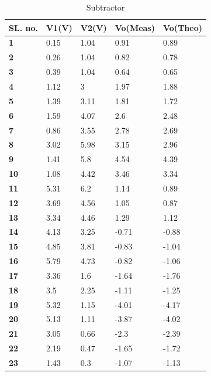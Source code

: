 \documentclass{scrartcl}
\newcommand{\1}{\mathbbm{1}}
\begin{document}
\begin{table}[!ht]
    \centering
    \caption{Subtractor}
    \begin{tabular}{|l|l|l|l|l|}
    \hline
        \textbf{SL. no.} & \textbf{V1(V)} & \textbf{V2(V)} & \textbf{Vo(Meas)} & \textbf{Vo(Theo)} \\ \hline
        \textbf{1} & 0.15 & 1.04 & 0.91 & 0.89 \\ \hline
        \textbf{2} & 0.26 & 1.04 & 0.82 & 0.78 \\ \hline
        \textbf{3} & 0.39 & 1.04 & 0.64 & 0.65 \\ \hline
        \textbf{4} & 1.12 & 3 & 1.97 & 1.88 \\ \hline
        \textbf{5} & 1.39 & 3.11 & 1.81 & 1.72 \\ \hline
        \textbf{6} & 1.59 & 4.07 & 2.6 & 2.48 \\ \hline
        \textbf{7} & 0.86 & 3.55 & 2.78 & 2.69 \\ \hline
        \textbf{8} & 3.02 & 5.98 & 3.15 & 2.96 \\ \hline
        \textbf{9} & 1.41 & 5.8 & 4.54 & 4.39 \\ \hline
        \textbf{10} & 1.08 & 4.42 & 3.46 & 3.34 \\ \hline
        \textbf{11} & 5.31 & 6.2 & 1.14 & 0.89 \\ \hline
        \textbf{12} & 3.69 & 4.56 & 1.05 & 0.87 \\ \hline
        \textbf{13} & 3.34 & 4.46 & 1.29 & 1.12 \\ \hline
        \textbf{14} & 4.13 & 3.25 & -0.71 & -0.88 \\ \hline
        \textbf{15} & 4.85 & 3.81 & -0.83 & -1.04 \\ \hline
        \textbf{16} & 5.79 & 4.73 & -0.82 & -1.06 \\ \hline
        \textbf{17} & 3.36 & 1.6 & -1.64 & -1.76 \\ \hline
        \textbf{18} & 3.5 & 2.25 & -1.11 & -1.25 \\ \hline
        \textbf{19} & 5.32 & 1.15 & -4.01 & -4.17 \\ \hline
        \textbf{20} & 5.13 & 1.11 & -3.87 & -4.02 \\ \hline
        \textbf{21} & 3.05 & 0.66 & -2.3 & -2.39 \\ \hline
        \textbf{22} & 2.19 & 0.47 & -1.65 & -1.72 \\ \hline
        \textbf{23} & 1.43 & 0.3 & -1.07 & -1.13 \\ \hline
    \end{tabular}
    \label{Sub}
\end{table}
\end{document}
